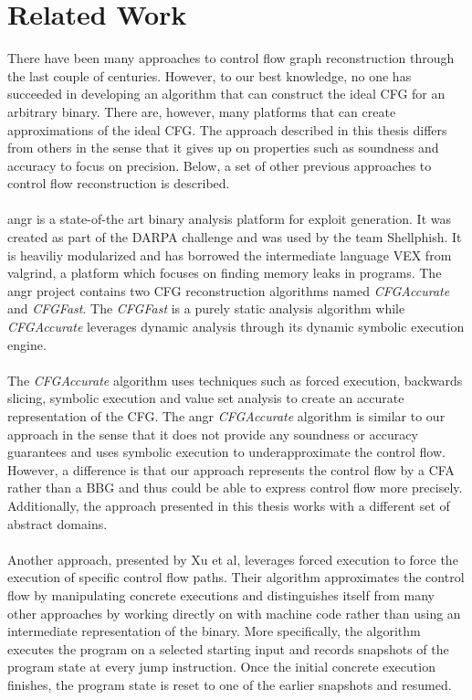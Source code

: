 \documentclass{kththesis}
\newcommand{\fbcomment}[1]{{#1}}
\renewcommand{\fbcomment}[1]{}
\renewcommand{\it}[1]{\textit{#1}}
\begin{document}
\section{Related Work}
\fbcomment{\color{red}Goal:Describe what has and hasn't been done in related work. Also, how the earlier work relates to what has been done in this thesis}
There have been many approaches to control flow graph reconstruction through the last couple of centuries. However, to our best knowledge, no one has succeeded in developing an algorithm that can construct the ideal CFG for an arbitrary binary. There are, however, many platforms that can create approximations of the ideal CFG. The approach described in this thesis differs from others in the sense that it gives up on properties such as soundness and accuracy to focus on precision. Below, a set of other previous approaches to control flow reconstruction is described.
\\ \\
angr\cite{angr} is a state-of-the art binary analysis platform for exploit generation. It was created as part of the DARPA challenge and was used by the team Shellphish. It is heaviliy modularized and has borrowed the intermediate language VEX from valgrind, a platform which focuses on finding memory leaks in programs. The angr project contains two CFG reconstruction algorithms named \textit{CFGAccurate} and \textit{CFGFast}. The \textit{CFGFast} is a purely static analysis algorithm while \textit{CFGAccurate} leverages dynamic analysis through its dynamic symbolic execution engine. 
\\ \\
The \textit{CFGAccurate} algorithm uses techniques such as forced execution, backwards slicing, symbolic execution and value set analysis to create an accurate representation of the CFG. The angr \it{CFGAccurate} algorithm is similar to our approach in the sense that it does not provide any soundness or accuracy guarantees and uses symbolic execution to underapproximate the control flow. However, a difference is that our approach represents the control flow by a CFA rather than a BBG and thus could be able to express control flow more precisely. Additionally, the approach presented in this thesis works with a different set of abstract domains.
\\ \\
Another approach, presented by Xu et al\cite{preciseCFG}, leverages forced execution to force the execution of specific control flow paths. Their algorithm approximates the control flow by manipulating concrete executions and distinguishes itself from many other approaches by working directly on with machine code rather than using an intermediate representation of the binary. More specifically, the algorithm executes the program on a selected starting input and records snapshots of the program state at every jump instruction. Once the initial concrete execution finishes, the program state is reset to one of the earlier snapshots and resumed. 
\end{document}
